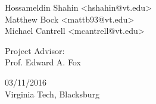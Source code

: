 \begin{titlepage}
\begin{center}
{    }
    \vspace{0.2cm}
    {\large
      Hossameldin Shahin <hshahin@vt.edu>\\
      Matthew Bock <mattb93@vt.edu>\\
      Michael Cantrell <mcantrell@vt.edu>\\
    }
  \end{center}
  \vfill
  \begin{center}
    {\Large
      Project Advisor:\\
    }
    \vspace{0.2cm}
    {\large
      Prof. Edward A. Fox\\
    }
  \end{center}
  \vfill
  \begin{center}
    {\Large
      03/11/2016\\
      Virginia Tech, Blacksburg\\
    }
  \end{center}
\end{titlepage}
\clearpage